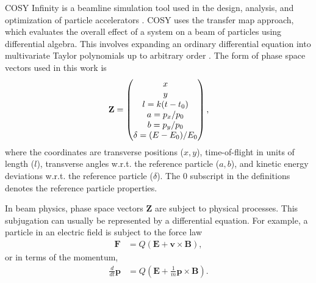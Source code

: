 \label{sec:cosy}\par
COSY Infinity is a beamline simulation tool used in the design, analysis, and optimization of particle accelerators \cite{cosy}. COSY uses the transfer map approach, which evaluates the overall effect of a system on a beam of particles using differential algebra. This involves expanding an ordinary differential equation into multivariate Taylor polynomials up to arbitrary order \cite{modernMapMethods}. The form of phase space vectors used in this work is
\begin{equation}
\centering
\mathbf{Z}=
\begin{pmatrix}
x\\ y\\ l=k(t-t_0)\\a=p_x/p_0\\b=p_y/p_0\\  \delta = (E-E_0)/E_0
\end{pmatrix},
\label{eqn:phaseSpaceVector}
\end{equation}
where the coordinates are transverse positions ($x, y$), time-of-flight in units of length ($l$), transverse angles w.r.t. the reference particle ($a, b$), and kinetic energy deviations w.r.t. the reference particle ($\delta$). The $0$ subscript in the definitions denotes the reference particle properties.

In beam physics, phase space vectors $\mathbf{Z}$ are subject to physical processes. This subjugation can usually be represented by a differential equation. For example, a particle in an electric field is subject to the force law \cite{griffithsem}
\begin{align}\nonumber
\mathbf{F}&=Q(\mathbf{E}+\mathbf{v}\times \mathbf{B}),
\end{align}
or in terms of the momentum,
\begin{align}\nonumber
\frac{d}{dt}\mathbf{p}&=Q(\mathbf{E}+\frac{1}{m}\mathbf{p}\times \mathbf{B}).
\end{align}

